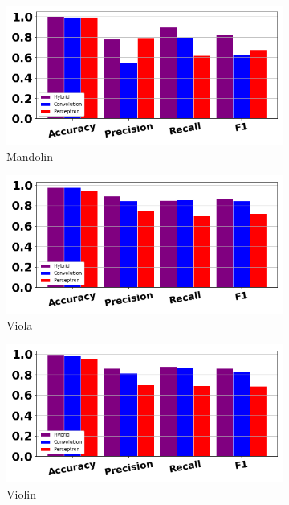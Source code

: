 \documentclass[12pt,letterpaper]{article}
\begin{document}
\begin{figure}[H]
	\begin{subfigure}[b]{0.45\textwidth}
	\centering
	\includegraphics[width=\textwidth]{../FiguresClasses/Mandolin}
	\caption{Mandolin}
	\end{subfigure}
	\hfill
	\begin{subfigure}[b]{0.45\textwidth}
	\centering
	\includegraphics[width=\textwidth]{../FiguresClasses/Viola}
	\caption{Viola}
	\end{subfigure}
	
	\begin{subfigure}[b]{0.45\textwidth}
	\centering
	\includegraphics[width=\textwidth]{../FiguresClasses/Violin}
	\caption{Violin}
	\end{subfigure}
	
\caption{}
\label{fig-StringScores}
\end{figure}
\end{document}
